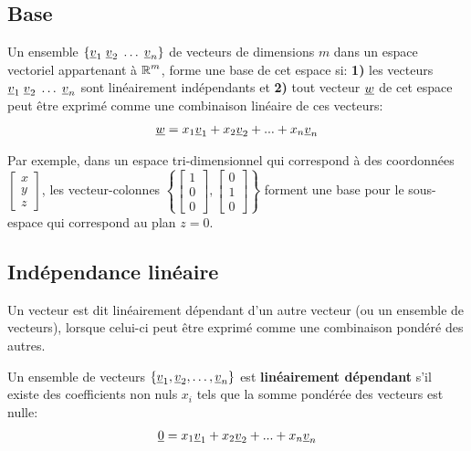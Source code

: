 \subsection{Base}
\label{sec:base}

Un ensemble $\{ \underline{v}_1 \; \underline{v}_2 \; \hdots \; \underline{v}_n \}$ de vecteurs de dimensions $m$ dans un espace vectoriel appartenant à $\operatorname{\mathbb{R}}^m$, forme une base de cet espace si: \textbf{1)} les vecteurs $\underline{v}_1 \; \underline{v}_2 \; \hdots \; \underline{v}_n$ sont linéairement indépendants et \textbf{2)} tout vecteur $\underline{w}$ de cet espace peut être exprimé comme une combinaison linéaire de ces vecteurs:
\begin{align}
\underline{w} = x_1 \underline{v}_1 + x_2 \underline{v}_2 + ... + x_n \underline{v}_n
\end{align}

Par exemple, dans un espace tri-dimensionnel qui correspond à des coordonnées $
\left[
\begin{array}{c}
x \\ y \\ z
\end{array}
\right]
$, les vecteur-colonnes $\left\{ 
\left[
\begin{array}{c}
1 \\ 0 \\ 0
\end{array}
\right],
\left[
\begin{array}{c}
0 \\ 1 \\ 0
\end{array}
\right]
\right\}$
forment une base pour le sous-espace qui correspond au plan $z=0$.

\subsection{Indépendance linéaire}
\label{sec:lindep}

Un vecteur est dit linéairement dépendant d'un autre vecteur (ou un ensemble de vecteurs), lorsque celui-ci peut être exprimé comme une combinaison pondéré des autres. 


Un ensemble de vecteurs $\left\{ \underline{v}_1, \underline{v}_2, \hdots, \underline{v}_n \right\}$ est \textbf{linéairement dépendant} s'il existe des coefficients non nuls $x_i$ tels que la somme pondérée des vecteurs est nulle:
\begin{align}
\underline{0} = x_1 \underline{v}_1 + x_2 \underline{v}_2 + ... + x_n \underline{v}_n
\end{align}

